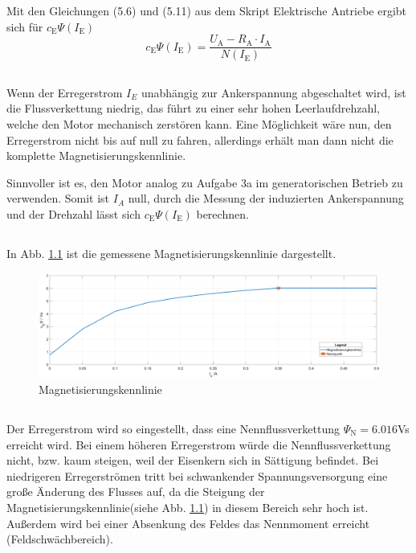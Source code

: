\chapter{}\label{ex:aufg4}
%
\section{}\label{sec:aufg4a}
Mit den Gleichungen (5.6) und (5.11) aus dem Skript Elektrische Antriebe ergibt sich für $c_\text{E}\Psi(I_\text{E})$
\begin{equation}
c_\text{E}\Psi(I_\text{E}) = \frac{U_\text{A} - R_\text{A} \cdot I_\text{A}}{N(I_\text{E})}
\end{equation}
\section{}\label{sec:aufg4b}
Wenn der Erregerstrom $I_E$ unabhängig zur Ankerspannung abgeschaltet wird, ist die Flussverkettung niedrig, das führt zu einer sehr hohen Leerlaufdrehzahl, welche den Motor mechanisch zerstören kann. Eine Möglichkeit wäre nun, den Erregerstrom nicht bis auf null zu fahren, allerdings erhält man dann nicht die komplette Magnetisierungskennlinie.

Sinnvoller ist es, den Motor analog zu Aufgabe 3a im generatorischen Betrieb zu verwenden. Somit ist $I_A$ null, durch die Messung der induzierten Ankerspannung und der Drehzahl lässt sich $c_\text{E}\Psi(I_\text{E})$ berechnen.

\section{}\label{sec:aufg4c}
%
In Abb. \ref{fig:magnet} ist die gemessene Magnetisierungskennlinie dargestellt.
\begin{figure}[htb]

\includegraphics[width=1\textwidth]{./Bilder/magentisierungkennlinie_1}
\caption{Magnetisierungskennlinie}
\label{fig:magnet}
\end{figure}
%
\section{}\label{sec:aufg4_d}
%
Der Erregerstrom wird so eingestellt, dass eine Nennflussverkettung $\Psi_\text{N} = 6.016$Vs erreicht wird. Bei einem höheren Erregerstrom würde die Nennflussverkettung nicht, bzw. kaum steigen, weil der Eisenkern sich in Sättigung befindet. Bei niedrigeren Erregerströmen tritt bei schwankender Spannungsversorgung eine große Änderung des Flusses auf, da die Steigung der Magnetisierungskennlinie(siehe Abb. \ref{fig:magnet}) in diesem Bereich sehr hoch ist. Außerdem wird bei einer Absenkung des Feldes das Nennmoment erreicht (Feldschwächbereich).
%
\clearpage